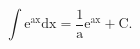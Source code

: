 \[ \int \mathrm{e}^{\mathrm{ax}} \mathrm{dx}
= \frac{1}{\mathrm{a}} \mathrm{e}^{\mathrm{ax}} + \mathrm{C} . \]